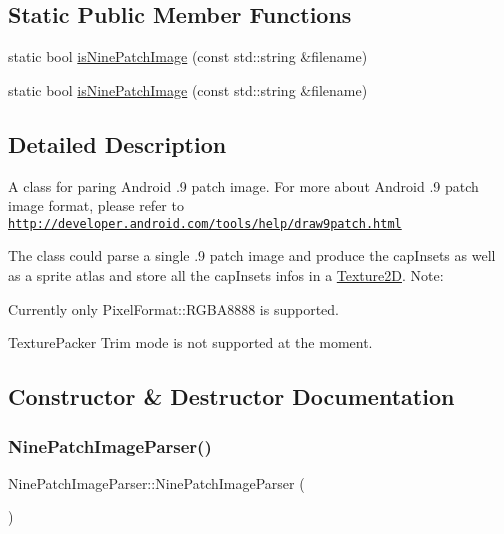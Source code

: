 \subsection*{Static Public Member Functions}
\begin{DoxyCompactItemize}
\item 
static bool \hyperlink{classNinePatchImageParser_a2be4f16b58661d5211b59fa121c32c22}{is\+Nine\+Patch\+Image} (const std\+::string \&filename)
\item 
static bool \hyperlink{classNinePatchImageParser_a914715744d8e64528fda1e8fd004438d}{is\+Nine\+Patch\+Image} (const std\+::string \&filename)
\end{DoxyCompactItemize}


\subsection{Detailed Description}
A class for paring Android .9 patch image. For more about Android .9 patch image format, please refer to \href{http://developer.android.com/tools/help/draw9patch.html}{\tt http\+://developer.\+android.\+com/tools/help/draw9patch.\+html}

The class could parse a single .9 patch image and produce the cap\+Insets as well as a sprite atlas and store all the cap\+Insets infos in a \hyperlink{classTexture2D}{Texture2D}. Note\+:
\begin{DoxyItemize}
\item Currently only Pixel\+Format\+::\+R\+G\+B\+A8888 is supported.
\item Texture\+Packer Trim mode is not supported at the moment. 
\end{DoxyItemize}

\subsection{Constructor \& Destructor Documentation}
\mbox{\label{classNinePatchImageParser_ad64d0b93c7f5a73386ba972d0f3a4d8d}} 
\subsubsection{\texorpdfstring{Nine\+Patch\+Image\+Parser()}{NinePatchImageParser()}\hspace{0.1cm}{\footnotesize\ttfamily [1/6]}}
{\footnotesize\ttfamily Nine\+Patch\+Image\+Parser\+::\+Nine\+Patch\+Image\+Parser (\begin{DoxyParamCaption}{ }\end{DoxyParamCaption})}

